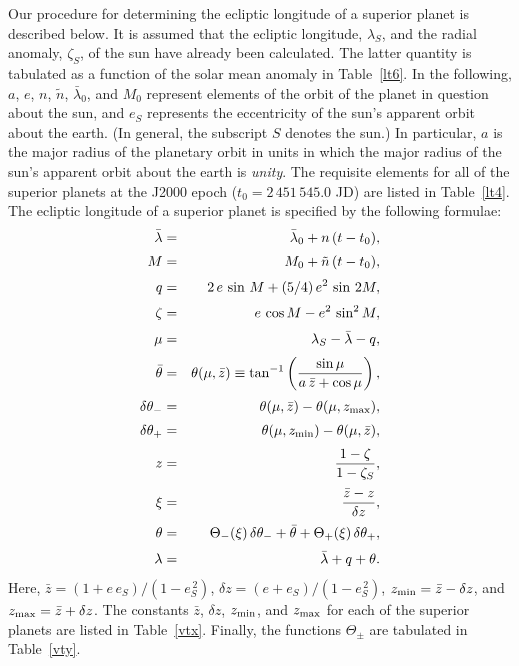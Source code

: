 Our procedure for determining the ecliptic longitude of a superior planet is described below. It is assumed that the ecliptic longitude, $\lambda_S$, and the
radial anomaly, $\zeta_S$, of the sun have already been calculated. The latter quantity is tabulated as a function of the solar mean anomaly
in Table~\ref{lt6}. In the following, $a$, $e$, $n$, $\tilde{n}$, $\bar{\lambda}_0$, and $M_0$ represent  elements of the orbit of the planet in question
about the sun, and $e_S$  represents the eccentricity of the sun's apparent orbit
about the earth. (In general, the subscript $S$ denotes the sun.) In particular, $a$ is the major radius of the planetary orbit in
units in which the major radius of the sun's apparent orbit about the
earth is {\em unity}. The requisite elements for all of the superior planets at the J2000 epoch ($t_0=2\,451\,545.0$ JD)
are listed in Table~\ref{lt4}. The ecliptic longitude of a superior
planet is specified by the following formulae:
\begin{eqnarray}
\bar{\lambda}&=&  \bar{\lambda}_0 + n\,(t-t_0) ,\\[0.5ex]
M &=& M_0  +\tilde{n}\,(t-t_0),\\[0.5ex]
q&=& 2\,e\,\sin \,M + (5/4)\,e^2\,\sin\,2M,\label{ve3.8}\\[0.5ex]
\zeta &=& e\,\cos M - e^2\,\sin^2 M,\\[0.5ex]
\mu&=& \lambda_S - \bar{\lambda}-q,\\[0.5ex]
\bar{\theta} &=& \theta(\mu,\bar{z})\equiv \tan^{-1} \left(\frac{\sin\mu}{a\,\bar{z}+\cos\mu}\right),\\[0.5ex]
\delta\theta_- &=& \theta(\mu,\bar{z}) - \theta(\mu,z_{\rm max}),\\[0.5ex]
\delta\theta_+&=& \theta(\mu,z_{\rm min}) - \theta(\mu,\bar{z}),\\[0.5ex]
z &=& \frac{1-\zeta}{1-\zeta_S},\\[0.5ex]
\xi &=& \frac{\bar{z}-z}{\delta z},\\[0.5ex]
\theta  &=&\Theta_-(\xi)\,\delta\theta_-+ \bar{\theta}
+ \Theta_+(\xi)\,\delta\theta_+,\\[0.5ex]
\lambda &=&\bar{\lambda} + q+ \theta.
\end{eqnarray}
Here, $\bar{z} = (1+e\,e_S)/(1-e_S^{\,2})$, $\delta z = (e+e_S)/(1-e_S^{\,2})$, $z_{\rm min} = \bar{z}-\delta z$,
and $z_{\rm max} = \bar{z}+\delta z$.  The constants $\bar{z}$, $\delta z$, $z_{\rm min}$, and $z_{\rm max}$ 
for each of the superior planets are listed in Table~\ref{vtx}.  Finally, the functions $\Theta_\pm$ are  tabulated in Table~\ref{vty}.

